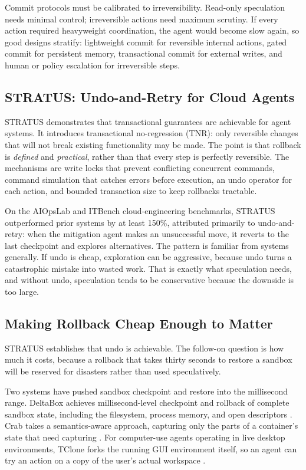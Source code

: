 \documentclass[11pt]{book}
\begin{document}
Commit protocols must be calibrated to irreversibility. Read-only speculation needs minimal control; irreversible actions need maximum scrutiny. If every action required heavyweight coordination, the agent would become slow again, so good designs stratify: lightweight commit for reversible internal actions, gated commit for persistent memory, transactional commit for external writes, and human or policy escalation for irreversible steps.

\subsection{STRATUS: Undo-and-Retry for Cloud Agents}

STRATUS \cite{jha2025stratus} demonstrates that transactional guarantees are achievable for agent systems. It introduces transactional no-regression (TNR): only reversible changes that will not break existing functionality may be made. The point is that rollback is \textit{defined} and \textit{practical}, rather than that every step is perfectly reversible. The mechanisms are write locks that prevent conflicting concurrent commands, command simulation that catches errors before execution, an undo operator for each action, and bounded transaction size to keep rollbacks tractable.

On the AIOpsLab and ITBench cloud-engineering benchmarks, STRATUS outperformed prior systems by at least 150\%, attributed primarily to undo-and-retry: when the mitigation agent makes an unsuccessful move, it reverts to the last checkpoint and explores alternatives. The pattern is familiar from systems generally. If undo is cheap, exploration can be aggressive, because undo turns a catastrophic mistake into wasted work. That is exactly what speculation needs, and without undo, speculation tends to be conservative because the downside is too large.

\subsection{Making Rollback Cheap Enough to Matter}

STRATUS establishes that undo is achievable. The follow-on question is how much it costs, because a rollback that takes thirty seconds to restore a sandbox will be reserved for disasters rather than used speculatively.

Two systems have pushed sandbox checkpoint and restore into the millisecond range. DeltaBox achieves millisecond-level checkpoint and rollback of complete sandbox state, including the filesystem, process memory, and open descriptors \cite{deltabox2026}. Crab takes a semantics-aware approach, capturing only the parts of a container's state that need capturing \cite{crab2026}. For computer-use agents operating in live desktop environments, TClone forks the running GUI environment itself, so an agent can try an action on a copy of the user's actual workspace \cite{tclone2026}.
\end{document}
